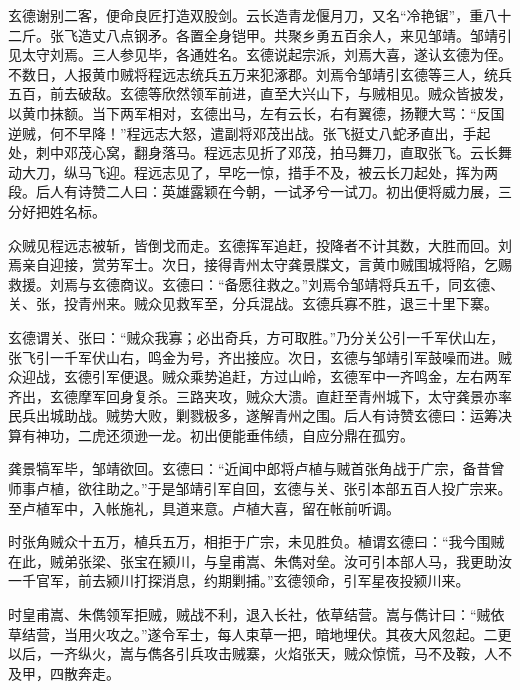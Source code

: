 玄德谢别二客，便命良匠打造双股剑。云长造青龙偃月刀，又名“冷艳锯”，重八十二斤。张飞造丈八点钢矛。各置全身铠甲。共聚乡勇五百余人，来见邹靖。邹靖引见太守刘焉。三人参见毕，各通姓名。玄德说起宗派，刘焉大喜，遂认玄德为侄。不数日，人报黄巾贼将程远志统兵五万来犯涿郡。刘焉令邹靖引玄德等三人，统兵五百，前去破敌。玄德等欣然领军前进，直至大兴山下，与贼相见。贼众皆披发，以黄巾抹额。当下两军相对，玄德出马，左有云长，右有翼德，扬鞭大骂：“反国逆贼，何不早降！”程远志大怒，遣副将邓茂出战。张飞挺丈八蛇矛直出，手起处，刺中邓茂心窝，翻身落马。程远志见折了邓茂，拍马舞刀，直取张飞。云长舞动大刀，纵马飞迎。程远志见了，早吃一惊，措手不及，被云长刀起处，挥为两段。后人有诗赞二人曰：英雄露颖在今朝，一试矛兮一试刀。初出便将威力展，三分好把姓名标。

众贼见程远志被斩，皆倒戈而走。玄德挥军追赶，投降者不计其数，大胜而回。刘焉亲自迎接，赏劳军士。次日，接得青州太守龚景牒文，言黄巾贼围城将陷，乞赐救援。刘焉与玄德商议。玄德曰：“备愿往救之。”刘焉令邹靖将兵五千，同玄德、关、张，投青州来。贼众见救军至，分兵混战。玄德兵寡不胜，退三十里下寨。

玄德谓关、张曰：“贼众我寡；必出奇兵，方可取胜。”乃分关公引一千军伏山左，张飞引一千军伏山右，鸣金为号，齐出接应。次日，玄德与邹靖引军鼓噪而进。贼众迎战，玄德引军便退。贼众乘势追赶，方过山岭，玄德军中一齐鸣金，左右两军齐出，玄德摩军回身复杀。三路夹攻，贼众大溃。直赶至青州城下，太守龚景亦率民兵出城助战。贼势大败，剿戮极多，遂解青州之围。后人有诗赞玄德曰：运筹决算有神功，二虎还须逊一龙。初出便能垂伟绩，自应分鼎在孤穷。

龚景犒军毕，邹靖欲回。玄德曰：“近闻中郎将卢植与贼首张角战于广宗，备昔曾师事卢植，欲往助之。”于是邹靖引军自回，玄德与关、张引本部五百人投广宗来。至卢植军中，入帐施礼，具道来意。卢植大喜，留在帐前听调。

时张角贼众十五万，植兵五万，相拒于广宗，未见胜负。植谓玄德曰：“我今围贼在此，贼弟张梁、张宝在颍川，与皇甫嵩、朱儁对垒。汝可引本部人马，我更助汝一千官军，前去颍川打探消息，约期剿捕。”玄德领命，引军星夜投颍川来。

时皇甫嵩、朱儁领军拒贼，贼战不利，退入长社，依草结营。嵩与儁计曰：“贼依草结营，当用火攻之。”遂令军士，每人束草一把，暗地埋伏。其夜大风忽起。二更以后，一齐纵火，嵩与儁各引兵攻击贼寨，火焰张天，贼众惊慌，马不及鞍，人不及甲，四散奔走。

